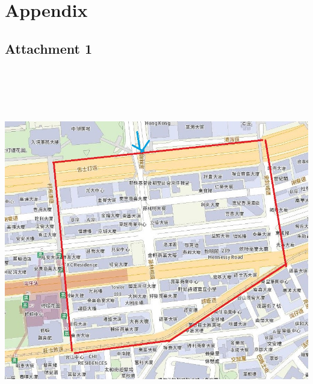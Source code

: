 \documentclass[12pt]{article}
\theoremstyle{definition}
\theoremstyle{remark}
\numberwithin{equation}{section}
\begin{document}
	\newpage
	\thispagestyle{empty}
	\pagestyle{plain}
	\clearpage
	\section*{Appendix}
	\subsection*{Attachment 1}
	\begin{center}
		\includegraphics[angle=90,height=16cm]{map.jpg}
	\end{center}
	
	
	
\end{document}

